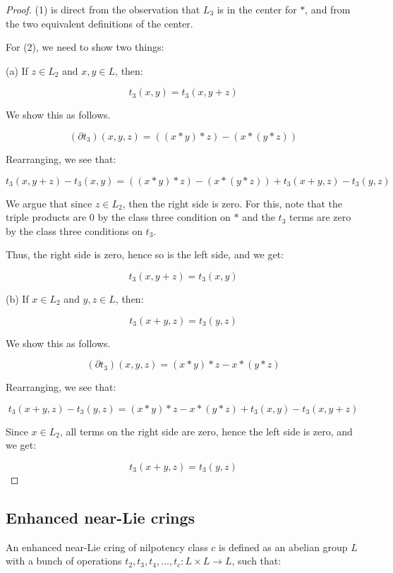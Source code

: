 \documentclass[10pt]{amsart}
\begin{document}
\begin{proof}
  (1) is direct from the observation that $L_3$ is in the center for
  $*$, and from the two equivalent definitions of the center.

  For (2), we need to show two things:

  (a) If $z \in L_2$ and $x,y \in L$, then:

  $$t_3(x,y) = t_3(x,y + z)$$

  We show this as follows.

  $$(\partial t_3)(x,y,z) = ((x * y) * z) - (x * (y * z))$$

  Rearranging, we see that:

  $$t_3(x,y + z) - t_3(x,y) = ((x * y) * z) - (x * (y * z)) + t_3(x + y,z) - t_3(y,z)$$

  We argue that since $z \in L_2$, then the right side is zero. For
  this, note that the triple products are $0$ by the class three
  condition on $*$ and the $t_3$ terms are zero by the class three
  conditions on $t_3$.

  Thus, the right side is zero, hence so is the left side, and we get:

  $$t_3(x,y + z) = t_3(x,y)$$

  (b) If $x \in L_2$ and $y,z \in L$, then:

  $$t_3(x + y,z) = t_3(y,z)$$

  We show this as follows.

  $$(\partial t_3)(x,y,z) = (x * y) * z - x * (y * z)$$

  Rearranging, we see that:

  $$t_3(x + y,z) - t_3(y,z) = (x * y) * z - x * (y * z) + t_3(x,y) - t_3(x,y + z)$$

  Since $x \in L_2$, all terms on the right side are zero, hence the
  left side is zero, and we get:

  $$t_3(x + y,z) = t_3(y,z)$$
\end{proof}

\subsection{Enhanced near-Lie crings}

An enhanced near-Lie cring of nilpotency class $c$ is defined as an
abelian group $L$ with a bunch of operations $t_2,t_3,t_4,\dots,t_c: L
\times L \to L$, such that:
\end{document}
